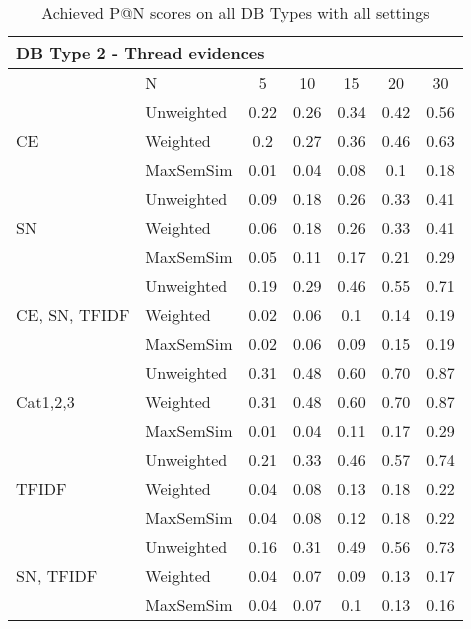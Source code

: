 \documentclass[conference]{IEEEtran}
\begin{document}
\begin{table*}[!h]
	\centering
	\renewcommand{\arraystretch}{1.3}
	\caption{Achieved P@N scores on all DB Types with all settings}
	\label{tab:resultsmrr2}
	\begin{tabular}{l||l|ccccc}\hline		
		
		\multicolumn{7}{l}{DB Type 2 - Thread evidences}\\\hline\hline
		& N & 5 & 10 & 15 & 20 & 30\\\hline
		\hline
		
		\multirow{3}{*}{CE} & Unweighted & 0.22 & 0.26 & 0.34 & 0.42 & 0.56\\
		 & Weighted & 0.2 & 0.27 & 0.36 & 0.46 & 0.63\\
		 & MaxSemSim & 0.01 & 0.04 & 0.08 & 0.1 & 0.18\\ 
		\hline
		
		\multirow{3}{*}{SN} & Unweighted & 0.09 & 0.18 & 0.26 & 0.33 & 0.41\\
		 & Weighted & 0.06 & 0.18 & 0.26 & 0.33 & 0.41\\
		 & MaxSemSim & 0.05 & 0.11 & 0.17 & 0.21 & 0.29\\ 
		\hline
		
		\multirow{3}{*}{CE, SN, TFIDF} & Unweighted & 0.19 & 0.29 & 0.46 & 0.55 & 0.71\\
		 & Weighted & 0.02 & 0.06 & 0.1 & 0.14 & 0.19\\
		 & MaxSemSim & 0.02 & 0.06 & 0.09 & 0.15 & 0.19\\ 
		\hline
		
		\multirow{3}{*}{Cat1,2,3} & Unweighted & 0.31 & 0.48 & 0.60 & 0.70 & 0.87\\
		 & Weighted & 0.31 & 0.48 & 0.60 & 0.70 & 0.87\\
		 & MaxSemSim & 0.01 & 0.04 & 0.11 & 0.17 & 0.29\\ 
		\hline
		
		\multirow{3}{*}{TFIDF} & Unweighted & 0.21 & 0.33 & 0.46 & 0.57 & 0.74\\
		 & Weighted & 0.04 & 0.08 & 0.13 & 0.18 & 0.22\\
		 & MaxSemSim & 0.04 & 0.08 & 0.12 & 0.18 & 0.22\\ 
		\hline
		
		\multirow{3}{*}{SN, TFIDF} & Unweighted & 0.16 & 0.31 & 0.49 & 0.56 & 0.73\\
		 & Weighted & 0.04 & 0.07 & 0.09 & 0.13 & 0.17\\
		 & MaxSemSim & 0.04 & 0.07 & 0.1 & 0.13 & 0.16\\ 
		\hline		
		

\end{tabular}
\end{table*}
\end{document}
